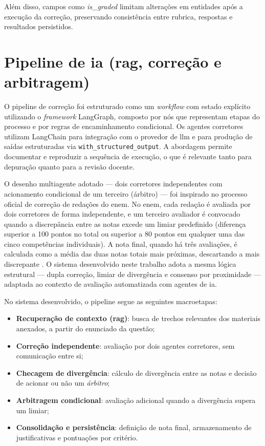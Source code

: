 Além disso, campos como \textit{is\_graded} limitam alterações em entidades após a execução da correção, preservando consistência entre rubrica, respostas e resultados persistidos.

\section{Pipeline de \texorpdfstring{\gls{ia}}{IA} (\texorpdfstring{\gls{rag}}{RAG}, correção e arbitragem)}

O pipeline de correção foi estruturado como um \textit{workflow} com estado explícito utilizando o \textit{framework} LangGraph, composto por nós que representam etapas do processo e por regras de encaminhamento condicional. Os agentes corretores utilizam LangChain para integração com o provedor de \gls{llm} e para produção de saídas estruturadas via \texttt{with\_structured\_output}. A abordagem permite documentar e reproduzir a sequência de execução, o que é relevante tanto para depuração quanto para a revisão docente.

O desenho multiagente adotado --- dois corretores independentes com acionamento condicional de um terceiro (árbitro) --- foi inspirado no processo oficial de correção de redações do \gls{enem}. No \gls{enem}, cada redação é avaliada por dois corretores de forma independente, e um terceiro avaliador é convocado quando a discrepância entre as notas excede um limiar predefinido (diferença superior a 100 pontos no total ou superior a 80 pontos em qualquer uma das cinco competências individuais). A nota final, quando há três avaliações, é calculada como a média das duas notas totais mais próximas, descartando a mais discrepante \cite{inep_cartilha_redacao_2024}. O sistema desenvolvido neste trabalho adota a mesma lógica estrutural --- dupla correção, limiar de divergência e consenso por proximidade --- adaptada ao contexto de avaliação automatizada com agentes de \gls{ia}.

No sistema desenvolvido, o pipeline segue as seguintes macroetapas:

\begin{itemize}
    \item \textbf{Recuperação de contexto (\gls{rag})}: busca de trechos relevantes dos materiais anexados, a partir do enunciado da questão;
    \item \textbf{Correção independente}: avaliação por dois agentes corretores, sem comunicação entre si;
    \item \textbf{Checagem de divergência}: cálculo de divergência entre as notas e decisão de acionar ou não um \textit{árbitro};
    \item \textbf{Arbitragem condicional}: avaliação adicional quando a divergência supera um limiar;
    \item \textbf{Consolidação e persistência}: definição de nota final, armazenamento de justificativas e pontuações por critério.
\end{itemize}

